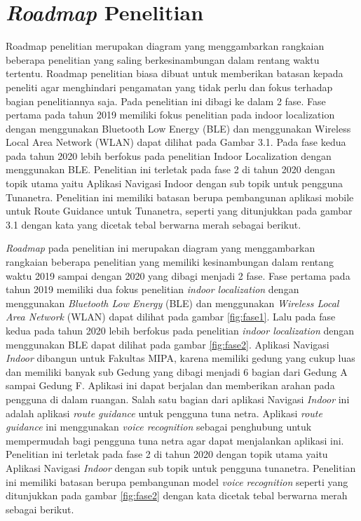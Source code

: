 \section{\textit{Roadmap} Penelitian}
Roadmap penelitian merupakan diagram yang menggambarkan rangkaian beberapa penelitian yang saling berkesinambungan dalam rentang waktu tertentu. Roadmap penelitian biasa dibuat untuk memberikan batasan kepada peneliti agar menghindari pengamatan yang tidak perlu dan fokus terhadap bagian penelitiannya saja. Pada penelitian ini dibagi ke dalam 2 fase. Fase pertama pada tahun 2019 memiliki fokus penelitian pada indoor localization dengan menggunakan Bluetooth Low Energy (BLE) dan menggunakan Wireless Local Area Network (WLAN) dapat dilihat pada Gambar 3.1. Pada fase kedua pada tahun 2020 lebih berfokus pada penelitian Indoor Localization dengan menggunakan BLE. Penelitian ini terletak pada fase 2 di tahun 2020 dengan topik utama yaitu Aplikasi Navigasi Indoor dengan sub topik untuk pengguna Tunanetra. Penelitian ini memiliki batasan berupa pembangunan aplikasi mobile untuk Route Guidance untuk Tunanetra, seperti yang ditunjukkan pada gambar 3.1 dengan kata yang dicetak tebal berwarna merah sebagai berikut.


\textit{Roadmap} pada penelitian ini merupakan diagram yang menggambarkan rangkaian beberapa penelitian yang memiliki kesinambungan dalam rentang waktu 2019 sampai dengan 2020 yang dibagi menjadi 2 fase. Fase pertama pada tahun 2019 memiliki dua fokus penelitian \textit{indoor localization} dengan menggunakan \textit{Bluetooth Low Energy} (BLE) dan menggunakan \textit{Wireless Local Area Network} (WLAN) dapat dilihat pada gambar \ref{fig:fase1}. Lalu pada fase kedua pada tahun 2020 lebih berfokus pada penelitian \textit{indoor localization} dengan menggunakan BLE dapat dilihat pada gambar \ref{fig:fase2}. Aplikasi Navigasi \textit{Indoor} dibangun untuk Fakultas MIPA, karena memiliki gedung yang cukup luas dan memiliki banyak sub Gedung yang dibagi menjadi 6 bagian dari Gedung A sampai Gedung F. Aplikasi ini dapat berjalan dan memberikan arahan pada pengguna di dalam ruangan. Salah satu bagian dari aplikasi Navigasi \textit{Indoor} ini adalah aplikasi \textit{route guidance} untuk pengguna tuna netra. Aplikasi \textit{route guidance} ini menggunakan \textit{voice recognition} sebagai penghubung untuk mempermudah bagi pengguna tuna netra agar dapat menjalankan aplikasi ini. Penelitian ini terletak pada fase 2 di tahun 2020 dengan topik utama yaitu Aplikasi Navigasi \textit{Indoor} dengan sub topik untuk pengguna tunanetra. Penelitian ini memiliki batasan berupa pembangunan model \textit{voice recognition} seperti yang ditunjukkan pada gambar \ref{fig:fase2} dengan kata dicetak tebal berwarna merah sebagai berikut.

